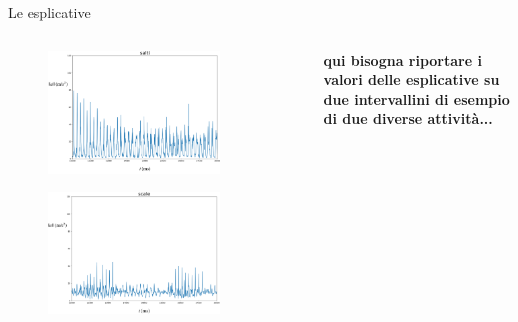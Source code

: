 \documentclass{beamer}
\begin{document}
\begin{frame}{Le esplicative}
\begin{columns}[T] %
\begin{column}{.48\textwidth}
\begin{figure}[H]
\includegraphics[width=0.8\textwidth]{../figure/salti.png}
\end{figure}
\begin{figure}[H]
\includegraphics[width=0.8\textwidth]{../figure/scale.png}
\end{figure}
\end{column}%
\hfill%
\begin{column}{.4\textwidth}
\textbf{qui bisogna riportare i valori delle esplicative su due intervallini di esempio di due diverse attività...}
\end{column}%
\end{columns}
\end{frame}
\end{document}
